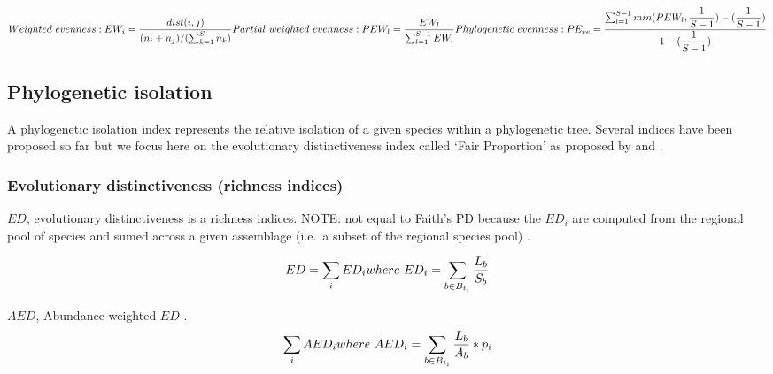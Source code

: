 \documentclass[]{book}
\theoremstyle{definition}
\theoremstyle{definition}
\theoremstyle{definition}
\theoremstyle{remark}
\begin{document}
\[
Weighted \ evenness: \\
EW_{i} = \dfrac{dist(i,j)}
{(n_{i} + n_{j})/(\sum_{k=1}^{S}n_{k})} \\
\ \\
Partial \ weighted \ evenness: \\ 
PEW_{l} = \dfrac
{EW_{l}}
{\sum_{l=1}^{S-1} EW_{l}} \\
\ \\
Phylogenetic \ evenness: \\
PE_{ve} = \dfrac
{\sum_{l=1}^{S-1} min(PEW_{l}, \dfrac{1}{S-1}) - (\dfrac{1}{S-1})}
{1- (\dfrac{1}{S-1})}
\]

\hypertarget{phylogenetic-isolation}{\subsection{Phylogenetic
isolation}\label{phylogenetic-isolation}}

A phylogenetic isolation index represents the relative isolation of a
given species within a phylogenetic tree. Several indices have been
proposed so far but we focus here on the evolutionary distinctiveness
index called `Fair Proportion' as proposed by \citet{Redding2003} and
\citet{Isaac2007}.

\subsubsection{Evolutionary distinctiveness (richness
indices)}\label{evolutionary-distinctiveness-richness-indices}

\(ED\), evolutionary distinctiveness is a richness indices. NOTE: not
equal to Faith's PD because the \(ED_{i}\) are computed from the
regional pool of species and sumed across a given assemblage (i.e.~a
subset of the regional species pool)
\citep{Tucker2016, Safi2013a, Redding2003, Isaac2007}.

\[
  ED = \sum_{i}ED_{i} \\
  \ \\ 
  where \ ED_{i} = \sum_{b \in B_{t_{i}}} \dfrac{L_{b}}{S_{b}} 
\]

\(AED\), Abundance-weighted \(ED\) \citep{Tucker2016, Cadotte2010}. \[
\sum_{i} AED_{i} \\
\ \\
where \ AED_{i} = \sum_{b \in B_{t_{i}}} \dfrac{L_{b}}{A_{b} }* p_{i}
\]
\end{document}
